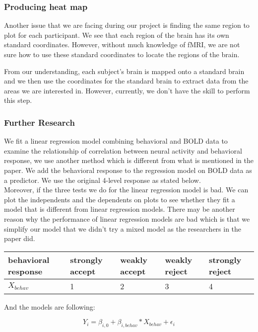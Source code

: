 \subsubsection{Producing heat map}

\indent \indent Another issue that we are facing during our project is finding 
the same region to plot for each participant. We see that each region of the 
brain has its own standard coordinates. However, without much knowledge of 
fMRI, we are not sure how to use these standard coordinates to locate the 
regions of the brain.

From our understanding, each subject's brain is mapped onto a standard brain 
and we then use the coordinates for the standard brain to extract data from 
the areas we are interested in. However, currently, we don't have the skill to 
perform this step.

\subsubsection{Further Research}

We fit a linear regression model combining behavioral and BOLD data to examine 
the relationship of correlation between neural activity and behavioral 
response, we use another method which is different from what is mentioned in 
the paper. We add the behavioral response to the regression model on BOLD data 
as a predictor. We use the original 4-level response as stated below. \\ 

Moreover, if the three tests we do for the linear regression model is bad. We 
can plot the independents and the dependents on plots to see whether they fit a 
model that is different from linear regression models. There may be another 
reason why the performance of linear regression models are bad which is that we 
simplify our model that we didn’t try a mixed model as the researchers in the 
paper did.

\begin{tabular}{lllll}
\hline
behavioral response & strongly accept & weakly accept & weakly reject & 
strongly reject\\ 
\hline
$X_{behav}$ & 1 & 2 & 3 & 4 \\
\hline
\end{tabular}

And the models are following:

\begin{equation}
Y_{i} = \beta_{i, 0} + \beta_{i, behav} * X_{behav} + \epsilon_i
\end{equation}

